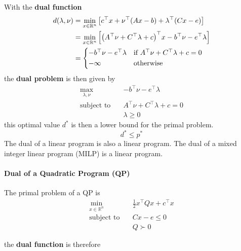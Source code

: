 With the \textbf{dual function}
\begin{align*}
    d(\lambda, \nu) & = \min_{x\in\mathbb{R}^n} \left[c^\top x + \nu^\top (Ax-b) + \lambda^\top(Cx-e)\right]                              \\
                    & = \min_{x\in\mathbb{R}^n} \left[{\left(A^\top\nu+C^\top\lambda+c\right)}^\top x - b^\top\nu - e^\top \lambda\right] \\
                    & =\begin{cases*}
                           -b^\top\nu - e^\top \lambda & if $A^\top\nu+ C^\top\lambda+c = 0$ \\
                           -\infty                     & otherwise
                       \end{cases*}
\end{align*}
the \textbf{dual problem} is then given by
\begin{align*}
    \max_{\lambda,\nu}     & - b^\top \nu - e^\top\lambda  \\
    \text{subject to}\quad & A^\top\nu+C^\top\lambda+c = 0 \\
                           & \lambda \geq 0
\end{align*}
this optimal value $d^*$ is then a lower bound for the primal problem.
\begin{equation*}
    d^* \leq p^*
\end{equation*}
The dual of a linear program is also a linear program.
\newpar{}
The dual of a mixed integer linear program (MILP) is a linear program.

\paragraph{Dual of a Quadratic Program (QP)}

The primal problem of a QP is
\begin{align*}
    \min_{x\in\mathbb{R}^n} & \frac{1}{2}x^\top Qx + c^\top x \\
    \text{subject to}\quad  & Cx-e \leq 0                     \\
                            & Q \succ 0
\end{align*}

the \textbf{dual function} is therefore

